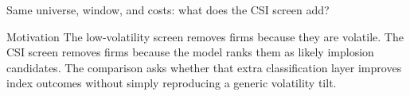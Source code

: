 \documentclass[10pt]{beamer}\usepackage[]{graphicx}\usepackage[table]{xcolor}
\begin{document}
\begin{frame}{Same universe, window, and costs: what does the CSI screen add?}
\begin{center}
\end{center}

\begin{block}{Motivation}
\footnotesize
The low-volatility screen removes firms because they are volatile. The CSI screen removes firms because the model ranks them as likely implosion candidates. The comparison asks whether that extra classification layer improves index outcomes without simply reproducing a generic volatility tilt.
\end{block}

\end{frame}

\end{document}
